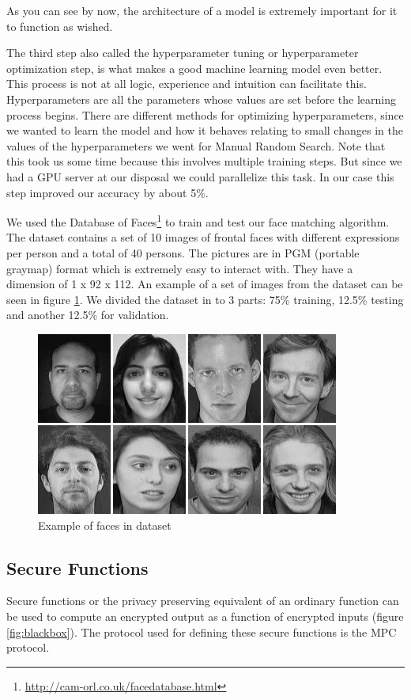 As you can see by now, the architecture of a model is extremely important for it to function as wished.

The third step also called the hyperparameter tuning or hyperparameter optimization step, is what makes a good machine learning model even better. This process is not at all logic, experience and intuition can facilitate this. Hyperparameters are all the parameters whose values are set before the learning process begins. There are different methods for optimizing hyperparameters, since we wanted to learn the model and how it behaves relating to small changes in the values of the hyperparameters we went for Manual Random Search. Note that this took us some time because this involves multiple training steps. But since we had a GPU server at our disposal we could parallelize this task. In our case this step improved our accuracy by about 5\%.

We used the Database of Faces\footnote{\url{http://cam-orl.co.uk/facedatabase.html}} to train and test our face matching algorithm. The dataset contains a set of 10 images of frontal faces with different expressions per person and a total of 40 persons. The pictures are in PGM (portable graymap) format which is extremely easy to interact with. They have a dimension of 1 x 92 x 112. An example of a set of images from the dataset can be seen in figure \ref{fig:databaseoffaces}. We divided the dataset in to 3 parts: 75\% training, 12.5\% testing and another 12.5\% for validation.

\begin{figure}[H]
  \includegraphics[scale=0.7]{fig/databaseoffacess.png}
  \centering
  \caption{Example of faces in dataset}
  \label{fig:databaseoffaces}
\end{figure}

\subsection{Secure Functions}
\label{Secure Functions}
Secure functions or the privacy preserving equivalent of an ordinary function can be used to compute an encrypted output as a function of encrypted inputs (figure \ref{fig:blackbox}). The protocol used for defining these secure functions is the MPC protocol.

